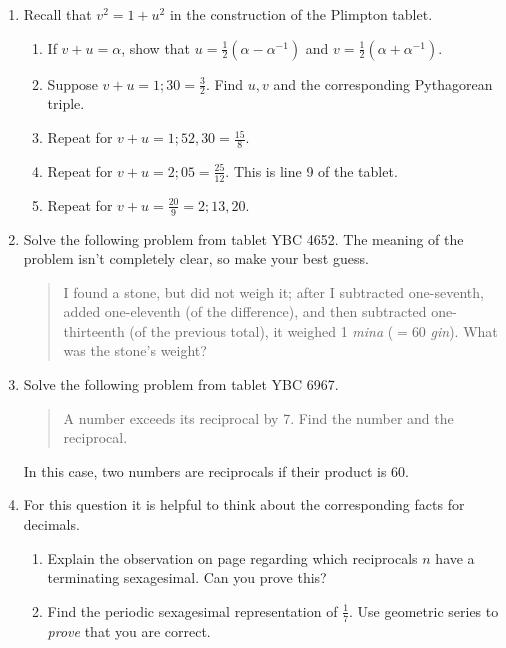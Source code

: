 \begin{exercises*}{}{}
\begin{enumerate}
	  
	  \item\label{exs:plimpton}%
	  Recall that $v^2=1+u^2$ in the construction of the Plimpton tablet.
	  \begin{enumerate}
	    \item If $v+u=\alpha$, show that $u=\frac 12(\alpha-\alpha^{-1})$ and $v=\frac 12(\alpha+\alpha^{-1})$.
	    \item Suppose $v+u=1;30=\frac 32$. Find $u,v$ and the corresponding Pythagorean triple.
	  	\item Repeat for $v+u=1;52,30=\frac{15}8$.
	  	\item Repeat for $v+u=2;05=\frac{25}{12}$. This is line 9 of the tablet.
	  	\item Repeat for $v+u=\frac{20}9=2;13,20$.
	  \end{enumerate}
	
	  
	  \item%
	  Solve the following problem from tablet YBC 4652. The meaning of the problem isn't completely clear, so make your best guess.
	  \begin{quote}
	  	I found a stone, but did not weigh it; after I subtracted one-seventh, added one-eleventh (of the difference), and then subtracted one-thirteenth (of the previous total), it weighed 1 \emph{mina} ($=60$ \emph{gin}). What was the stone's weight?
	  \end{quote} 
	  
	  
	  
	  \item%
	  Solve the following problem from tablet YBC 6967.
	  \begin{quote}
	  	A number exceeds its reciprocal by 7. Find the number and the reciprocal.
	  \end{quote} 
	  In this case, two numbers are reciprocals if their product is 60.
	
	
	  \item For this question it is helpful to think about the corresponding facts for decimals.
	  \begin{enumerate}
	    \item Explain the observation on page \pageref{babfraction} regarding which reciprocals $n$ have a terminating sexagesimal. Can you prove this?
	    
	  	\item Find the periodic sexagesimal representation of $\frac 17$. Use geometric series to \emph{prove} that you are correct.
	  \end{enumerate}  
	  

\end{enumerate}
\end{exercises*}
